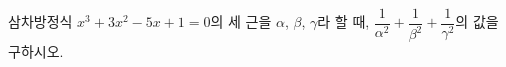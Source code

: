 삼차방정식 $x^3+3x^2-5x+1=0$의 세 근을 $\alpha$, $\beta$, $\gamma$라 할 때, $\dfrac{1}{\alpha^2}+\dfrac{1}{\beta^2}+\dfrac{1}{\gamma^2}$의 값을 구하시오.
